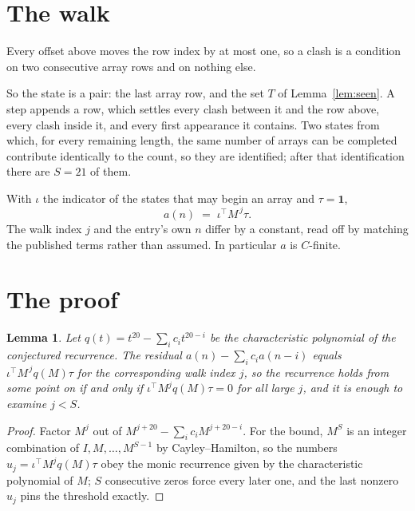 \documentclass[11pt,a4paper]{article}
\theoremstyle{plain}
\newtheorem{lemma}[theorem]{Lemma}
\theoremstyle{definition}
\begin{document}
\section{The walk}

Every offset above moves the row index by at most one, so a clash is a condition on two
consecutive array rows and on nothing else.

So the state is a pair: the last array row, and the set $T$ of Lemma~\ref{lem:seen}. A step
appends a row, which settles every clash between it and the row above, every clash inside it,
and every first appearance it contains. Two states from which, for every remaining length, the
same number of arrays can be completed contribute identically to the count, so they are
identified; after that identification there are $S=21$ of them.

With $\iota$ the indicator of the states that may begin an array and $\tau=\mathbf{1}$,
\[
a(n)\;=\;\iota^{\!\top}M^{\,j}\tau .
\]
The walk index $j$ and the entry's own $n$ differ by a constant, read off by matching the
published terms rather than assumed. In particular $a$ is $C$-finite.

\section{The proof}

\begin{lemma}\label{lem:crit}
Let $q(t)=t^{20}-\sum_i c_it^{20-i}$ be the characteristic polynomial of the
conjectured recurrence. The residual $a(n)-\sum_ic_ia(n-i)$ equals
$\iota^{\!\top}M^{\,j}q(M)\tau$ for the corresponding walk index $j$, so the recurrence
holds from some point on if and only if $\iota^{\!\top}M^{j}q(M)\tau=0$ for all large $j$,
and it is enough to examine $j<S$.
\end{lemma}

\begin{proof}
Factor $M^{j}$ out of $M^{j+20}-\sum_ic_iM^{j+20-i}$. For the bound, $M^{S}$
is an integer combination of $I,M,\dots,M^{S-1}$ by Cayley--Hamilton, so the numbers
$u_j=\iota^{\!\top}M^{j}q(M)\tau$ obey the monic recurrence given by the characteristic
polynomial of $M$; $S$ consecutive zeros force every later one, and the last nonzero $u_j$
pins the threshold exactly.
\end{proof}
\end{document}
